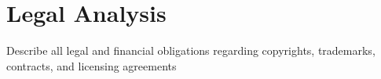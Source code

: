 \chapter{Legal Analysis}
Describe all legal and financial obligations regarding copyrights, trademarks,
contracts, and licensing agreements